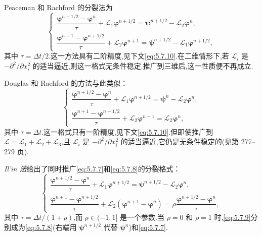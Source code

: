 Peaceman 和 Rachford 的分裂法为
\begin{equation}\label{eq:5.7.7}
  \begin{cases}
    \dfrac{\boldsymbol{\varphi}^{n+1/2}-\boldsymbol{\varphi}^n}{\tau}
      +\mathcal L_1\boldsymbol{\varphi}^{n+1/2}=\boldsymbol{\psi}^{n+1/2}-\mathcal L_2\boldsymbol{\varphi}^n,\\[4pt]
    \dfrac{\boldsymbol{\varphi}^{n+1}-\boldsymbol{\varphi}^{n+1/2}}{\tau}
      +\mathcal L_2\boldsymbol{\varphi}^{n+1}=\boldsymbol{\psi}^{n+1/2}-\mathcal L_1\boldsymbol{\varphi}^{n+1/2},
  \end{cases}
\end{equation}
其中 \(\tau=\Delta t/2\).这一方法具有二阶精度,见下文\eqref{eq:5.7.10}.在二维情形下,若 \(\mathcal L_i\) 是 \(-\partial^2/\partial x_i^2\) 的适当逼近,则这一格式无条件稳定.推广到三维后,这一性质便不再成立.

Douglas 和 Rachford 的方法与此类似：
\begin{equation}\label{eq:5.7.8}
  \begin{cases}
    \dfrac{\boldsymbol{\varphi}^{n+1/2}-\boldsymbol{\varphi}^n}{\tau}
      +\mathcal L_1\boldsymbol{\varphi}^{n+1/2}=\boldsymbol{\psi}^n-\mathcal L_2\boldsymbol{\varphi}^n,\\[4pt]
    \dfrac{\boldsymbol{\varphi}^{n+1}-\boldsymbol{\varphi}^{n+1/2}}{\tau}
      +\mathcal L_2\boldsymbol{\varphi}^{n+1}=\mathcal L_2\boldsymbol{\varphi}^n,
  \end{cases}
\end{equation}
其中 \(\tau=\Delta t\).这一格式只有一阶精度,见下文\eqref{eq:5.7.10}.但即使推广到 \(\mathcal L=\mathcal L_1+\mathcal L_2+\mathcal L_3\),且 \(\mathcal L_i\) 是 \(-\partial^2/\partial x_i^2\) 的适当逼近,它仍是无条件稳定的(见第 277–279 页).

\emph{Il’in 法}给出了同时推广\eqref{eq:5.7.7}和\eqref{eq:5.7.8}的分裂格式：
\begin{equation}\label{eq:5.7.9}
  \begin{cases}
    \dfrac{\boldsymbol{\varphi}^{n+1/2}-\boldsymbol{\varphi}^n}{\tau}
      +\mathcal L_1\boldsymbol{\varphi}^{n+1/2}=\boldsymbol{\psi}^{n+1/2}-\mathcal L_2\boldsymbol{\varphi}^n,\\[4pt]
    \dfrac{\boldsymbol{\varphi}^{n+1}-\boldsymbol{\varphi}^{n+1/2}}{\tau}
      +\mathcal L_2(\boldsymbol{\varphi}^{n+1}-\boldsymbol{\varphi}^n)
      =\rho\dfrac{\boldsymbol{\varphi}^{n+1/2}-\boldsymbol{\varphi}^n}{\tau},
  \end{cases}
\end{equation}
其中 \(\tau=\Delta t/(1+\rho)\),而 \(\rho\in(-1,1]\) 是一个参数.当 \(\rho=0\) 和 \(\rho=1\) 时,\eqref{eq:5.7.9}分别成为\eqref{eq:5.7.8}(右端用 \(\boldsymbol{\psi}^{n+1/2}\) 代替 \(\boldsymbol{\psi}^n\))和\eqref{eq:5.7.7}.

